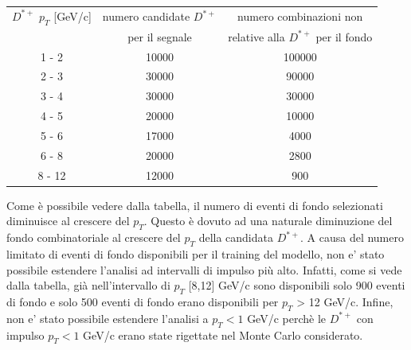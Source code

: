       \begin{table}[H]
		\centering
		\begin{tabular}{c|c|c}
		    \toprule
		    $D^{*+}$ $p_T$ [GeV/c]  &  numero candidate $D^{*+} $ & numero combinazioni non \\& per il segnale &relative alla $D^{*+}$ per il fondo \\
            \midrule
            1 - 2  	&  10000   &  100000  \\ 
            2 - 3 	&  30000   &  90000  \\
            3 - 4  	&  30000   &  30000  \\ 
            4 - 5  	&  20000   &  10000 \\ 
            5 - 6  	&  17000   &  4000  \\ 
            6 - 8  	&  20000   &  2800  \\ 
            8 - 12  &  12000   &   900 \\   
			\bottomrule
		\end{tabular}
	\end{table}
	
Come \`e possibile vedere dalla tabella, il numero di eventi di fondo selezionati diminuisce al crescere del $p_T$. Questo \`e dovuto ad una naturale diminuzione del fondo combinatoriale al crescere del $p_T$ della candidata $D^{*+}$. A causa del numero limitato di eventi di fondo disponibili per il training del modello, non e' stato possibile estendere l'analisi ad intervalli di impulso pi\`u alto. Infatti, come si vede dalla tabella, gi\`a nell'intervallo di $p_T$ [8,12] GeV/c sono disponibili solo 900 eventi di fondo e solo 500 eventi di fondo erano disponibili per $p_T$ > 12 GeV/c. Infine, non e' stato possibile estendere l'analisi a $p_T < 1$ GeV/c perch\`e le $D^{*+}$ con impulso $p_T < 1$ GeV/c erano state rigettate nel Monte Carlo considerato.

